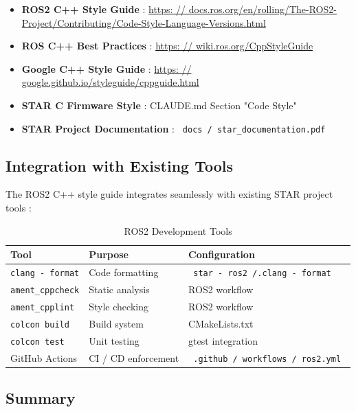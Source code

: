   \begin{itemize}
  \item \textbf{ROS2 C++ Style Guide} : \url {
  https: // docs.ros.org/en/rolling/The-ROS2-Project/Contributing/Code-Style-Language-Versions.html}
    \item \textbf{ROS C++ Best Practices} : \url {
    https: // wiki.ros.org/CppStyleGuide}
      \item \textbf{Google C++ Style Guide} : \url {
      https: // google.github.io/styleguide/cppguide.html}
        \item \textbf{STAR C Firmware Style} : CLAUDE.md Section
                                               "Code Style"
  \item \textbf{STAR Project Documentation} : \texttt {
          docs / star\_documentation.pdf
       }
        \end{itemize}

        \subsection{Integration with Existing Tools}

        The ROS2 C++ style guide integrates seamlessly with existing STAR
            project tools :

\begin{table}[H]
\centering
\begin{tabular} {
          | l | l | l |
       }
        \hline
\textbf{Tool} & \textbf{Purpose} & \textbf{Configuration}
        \\
\hline
\texttt{clang - format} & Code formatting & \texttt {
          star - ros2 /.clang - format
       }
        \\
\texttt{ament\_cppcheck} & Static analysis &ROS2 workflow \\
\texttt{ament\_cpplint} & Style checking &ROS2 workflow \\
\texttt{colcon build} & Build system &CMakeLists.txt \\
\texttt{colcon test} &
            Unit testing &gtest integration \\
GitHub Actions &CI /
                CD enforcement & \texttt {
          .github / workflows / ros2.yml
       }
        \\
\hline
\end{tabular}
        \caption{ROS2 Development Tools}
        \label{tab:ros2_tools}
        \end{table}

\subsection{Summary}

